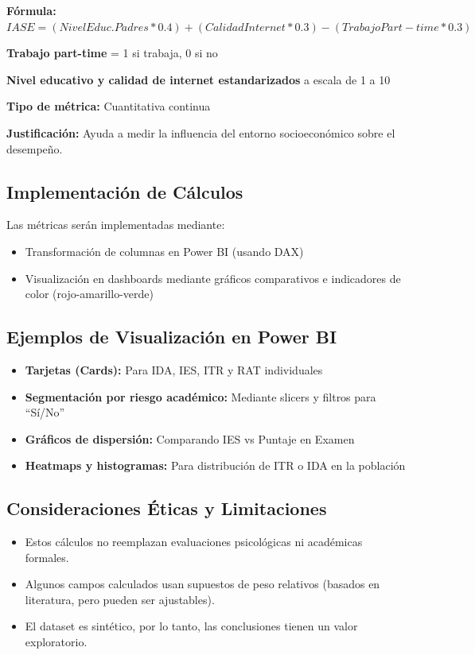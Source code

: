 \documentclass[12pt,letterpaper]{report}
\begin{document}
\textbf{Fórmula:}
\(IASE = (Nivel Educ. Padres * 0.4) + (Calidad Internet * 0.3) - (Trabajo Part-time * 0.3)
\)

\textbf{Trabajo part-time} = 1 si trabaja, 0 si no

\textbf{Nivel educativo y calidad de internet estandarizados} a escala de 1 a 10

\textbf{Tipo de métrica:} Cuantitativa continua

\textbf{Justificación:} Ayuda a medir la influencia del entorno socioeconómico sobre el desempeño.


\subsection{Implementación de Cálculos}
Las métricas serán implementadas mediante:  
\begin{itemize}
    \item Transformación de columnas en Power BI (usando DAX)
    \item Visualización en dashboards mediante gráficos comparativos e indicadores de color (rojo-amarillo-verde)
\end{itemize}

\subsection{Ejemplos de Visualización en Power BI}

\begin{itemize}
    \item \textbf{Tarjetas (Cards):} Para IDA, IES, ITR y RAT individuales
    \item \textbf{Segmentación por riesgo académico:} Mediante slicers y filtros para “Sí/No”
    \item \textbf{Gráficos de dispersión:} Comparando IES vs Puntaje en Examen
    \item \textbf{Heatmaps y histogramas:} Para distribución de ITR o IDA en la población
\end{itemize}

\subsection{Consideraciones Éticas y Limitaciones}

\begin{itemize}
    \item Estos cálculos no reemplazan evaluaciones psicológicas ni académicas formales.
    \item Algunos campos calculados usan supuestos de peso relativos (basados en literatura, pero pueden ser ajustables).
    \item El dataset es sintético, por lo tanto, las conclusiones tienen un valor exploratorio.
\end{itemize}
\end{document}
